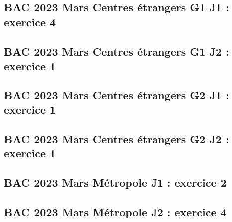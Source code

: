 \documentclass[lang=fr,edition=teacher,layout=sheet]{mxbook}
\begin{document}
\begingroup\endgroup
\par\bigskip
{}\subsection*{BAC 2023 Mars Centres étrangers G1 J1 : exercice 4}
\begingroup\endgroup
\par\bigskip
{}\subsection*{BAC 2023 Mars Centres étrangers G1 J2 : exercice 1}
\begingroup\endgroup
\par\bigskip
{}\subsection*{BAC 2023 Mars Centres étrangers G2 J1 : exercice 1}
\begingroup\endgroup
\par\bigskip
{}\subsection*{BAC 2023 Mars Centres étrangers G2 J2 : exercice 1}
\begingroup\endgroup
\par\bigskip
{}\subsection*{BAC 2023 Mars Métropole J1 : exercice 2}
\begingroup\endgroup
\par\bigskip
{}\subsection*{BAC 2023 Mars Métropole J2 : exercice 4}
\begingroup\endgroup
\par\bigskip
\end{document}
